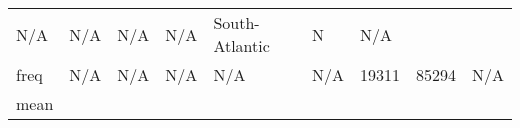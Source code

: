 \begin{longtable}[]{@{}lllllllll@{}}
\begin{minipage}[t]{0.09\columnwidth}
N/A\strut
\end{minipage} & \begin{minipage}[t]{0.09\columnwidth}\raggedright
N/A\strut
\end{minipage} & \begin{minipage}[t]{0.08\columnwidth}\raggedright
N/A\strut
\end{minipage} & \begin{minipage}[t]{0.09\columnwidth}\raggedright
N/A\strut
\end{minipage} & \begin{minipage}[t]{0.09\columnwidth}\raggedright
South-Atlantic\strut
\end{minipage} & \begin{minipage}[t]{0.08\columnwidth}\raggedright
N\strut
\end{minipage} & \begin{minipage}[t]{0.11\columnwidth}\raggedright
N/A\strut
\end{minipage}\tabularnewline
\begin{minipage}[t]{0.05\columnwidth}\raggedright
freq\strut
\end{minipage} & \begin{minipage}[t]{0.08\columnwidth}\raggedright
N/A\strut
\end{minipage} & \begin{minipage}[t]{0.09\columnwidth}\raggedright
N/A\strut
\end{minipage} & \begin{minipage}[t]{0.09\columnwidth}\raggedright
N/A\strut
\end{minipage} & \begin{minipage}[t]{0.08\columnwidth}\raggedright
N/A\strut
\end{minipage} & \begin{minipage}[t]{0.09\columnwidth}\raggedright
N/A\strut
\end{minipage} & \begin{minipage}[t]{0.09\columnwidth}\raggedright
19311\strut
\end{minipage} & \begin{minipage}[t]{0.08\columnwidth}\raggedright
85294\strut
\end{minipage} & \begin{minipage}[t]{0.11\columnwidth}\raggedright
N/A\strut
\end{minipage}\tabularnewline
\begin{minipage}[t]{0.05\columnwidth}\raggedright
mean\strut
\end{minipage} & \begin{minipage}[t]{0.08\columnwidth}\raggedright

\end{minipage}
\end{longtable}
